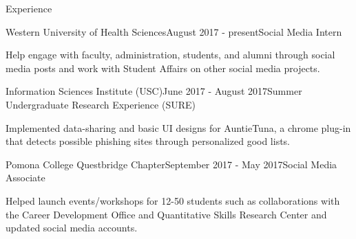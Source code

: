 \documentclass{resume} %
\begin{document}
\begin{rSection}{Experience}

\begin{rSubsection}{Western University of Health Sciences}{August 2017 - present}{Social Media Intern}{}
 \item Help engage with faculty, administration, students, and alumni through social media posts and work with Student Affairs on other social media projects.
\end{rSubsection}

\begin{rSubsection}{Information Sciences Institute (USC)}{June 2017 - August 2017}{Summer Undergraduate Research Experience (SURE)}{}
\item Implemented data-sharing and basic UI designs for AuntieTuna, a chrome plug-in that detects possible phishing sites through personalized good lists.
\end{rSubsection}

\begin{rSubsection}{Pomona College Questbridge Chapter}{September 2017 - May 2017}{Social Media Associate}{}
\item Helped launch events/workshops for 12-50 students such as collaborations with the Career Development Office and Quantitative Skills Research Center and updated social media accounts.
\end{rSubsection}

\end{rSection}
\end{document}
